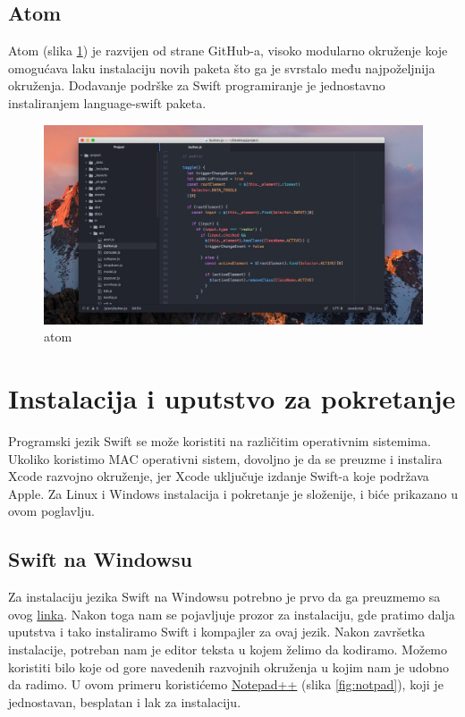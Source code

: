 \documentclass[a4paper]{article}
\begin{document}
\subsection{Atom}
\label{subsec:podnaslovAtom}
Atom (slika \ref{fig:atom}) je razvijen od strane GitHub-a, visoko modularno okruženje koje omogućava laku instalaciju novih paketa što ga je svrstalo među najpoželjnija okruženja. Dodavanje podrške za Swift programiranje je jednostavno instaliranjem language-swift paketa.

\begin{figure}[h!]
\begin{center}
\includegraphics[scale=0.2]{atom.jpg}
\end{center}
\caption{atom}
\label{fig:atom}
\end{figure}


\section{Instalacija i uputstvo za pokretanje}	
\label{sec:petiDeo}

Programski jezik Swift se može koristiti na različitim operativnim sistemima. Ukoliko koristimo MAC operativni sistem, dovoljno je da se preuzme i instalira Xcode razvojno okruženje, jer Xcode uključuje izdanje Swift-a koje podržava Apple. Za Linux i Windows instalacija i pokretanje je složenije, i biće prikazano u ovom poglavlju.

\subsection{Swift na Windowsu}
\label{subsec:podnaslovWindows}

Za instalaciju jezika Swift na Windowsu potrebno je prvo da ga preuzmemo sa ovog \href{https://swiftforwindows.github.io}{linka}. Nakon toga nam se pojavljuje prozor za instalaciju, gde pratimo dalja uputstva i tako instaliramo Swift i kompajler za ovaj jezik. Nakon završetka instalacije, potreban nam je editor teksta u kojem želimo da kodiramo. Možemo koristiti bilo koje od gore navedenih razvojnih okruženja u kojim nam je udobno da radimo. U ovom primeru koristićemo \href{https://notepad-plus-plus.org/download/v7.6.4.html}{Notepad++} (slika \ref{fig:notpad}), koji je jednostavan, besplatan i lak za instalaciju.
\end{document}
